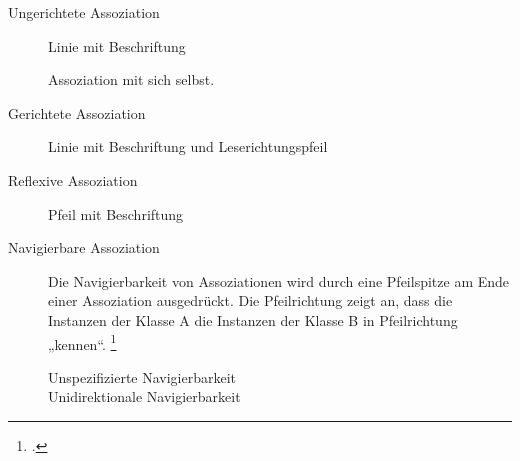 \documentclass{lehramt-informatik}
\begin{document}
\begin{description}
\item[Ungerichtete Assoziation]
Linie mit Beschriftung


Assoziation mit sich selbst.


\item[Gerichtete Assoziation]
Linie mit Beschriftung und Leserichtungspfeil


\item[Reflexive Assoziation]
Pfeil mit Beschriftung

%

\item[Navigierbare Assoziation]

Die Navigierbarkeit von Assoziationen wird durch eine Pfeilspitze am
Ende einer Assoziation ausgedrückt. Die Pfeilrichtung zeigt an, dass die
Instanzen der Klasse A die Instanzen der Klasse B in Pfeilrichtung
„kennen“.
\footcite[Seite 150]{rupp}

%

\begin{description}
\item[Unspezifizierte Navigierbarkeit] 


%

\item[Unidirektionale Navigierbarkeit] 

\end{description}
\end{description}
\end{document}
